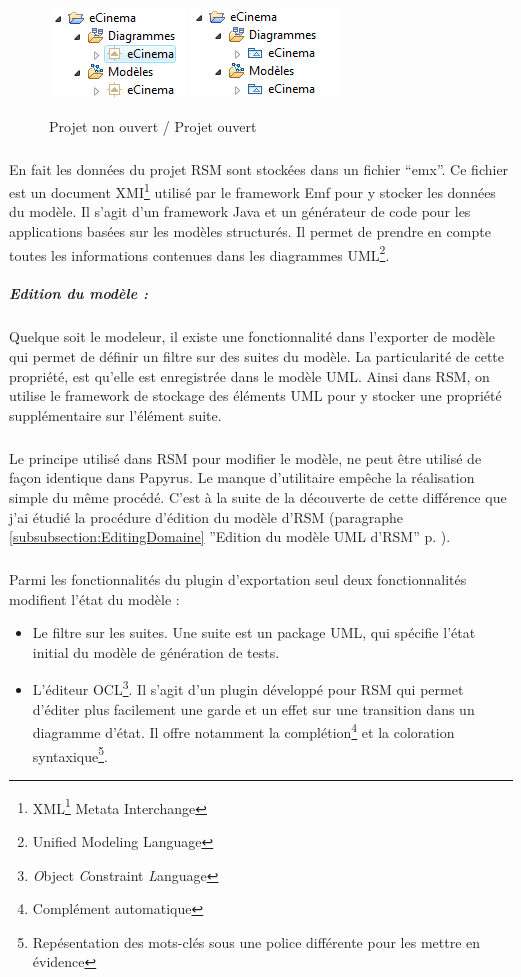 \begin{figure}[!h]
\begin{center}
  \includegraphics[scale=.7]{images/RsmOpenProject.png}
   \includegraphics[scale=.7]{images/RsmOpenProject2.png}
  \caption{Projet non ouvert / Projet ouvert}
  \label{OpenProject}
\end{center}
\end{figure}

\subparagraph*{} 
En fait les données du projet RSM sont stockées dans un fichier ``emx''. 
Ce fichier est un document XMI\footnote{XML\footnote{Extensible Markup Language} Metata Interchange} utilisé par le framework Emf pour y stocker les données du modèle. 
Il s'agit d'un framework Java et un générateur de code pour les applications basées sur les modèles structurés. Il permet de prendre en compte toutes les informations contenues dans les diagrammes UML\footnote{Unified Modeling Language}.

\subparagraph{Edition du modèle :}
Quelque soit le modeleur, il existe une fonctionnalité dans l'exporter de modèle qui permet de définir un filtre sur des suites du modèle.
La particularité de cette propriété, est qu'elle est enregistrée dans le modèle UML.
Ainsi dans RSM, on utilise le framework de stockage des éléments UML pour y stocker une propriété supplémentaire sur l'élément suite.

\subparagraph*{} 
Le principe utilisé dans RSM  pour modifier le modèle, ne peut être utilisé de façon identique dans Papyrus. 
Le manque d'utilitaire empêche la réalisation simple du même procédé.
C'est à la suite de la découverte de cette différence que j'ai étudié la procédure d'édition du modèle d'RSM (paragraphe \ref{subsubsection:EditingDomaine} ''Edition du modèle UML d'RSM'' p.\pageref{subsubsection:EditingDomaine} ).

\subparagraph*{}
Parmi les fonctionnalités du plugin d'exportation seul deux fonctionnalités modifient l'état du modèle :
\begin{itemize}
  \item Le filtre sur les suites. 
  		Une suite est un package UML, qui spécifie l'état initial du modèle de génération de tests.
  \item L'éditeur OCL\footnote{\textit{O}bject \textit{C}onstraint \textit{L}anguage}. Il s'agit d'un plugin développé pour RSM qui permet d'éditer plus facilement une garde et un effet sur une transition dans un diagramme d'état. Il offre notamment la complétion\footnote{Complément automatique} et la coloration syntaxique\footnote{Repésentation des mots-clés sous une police différente pour les mettre en évidence}.
\end{itemize}

